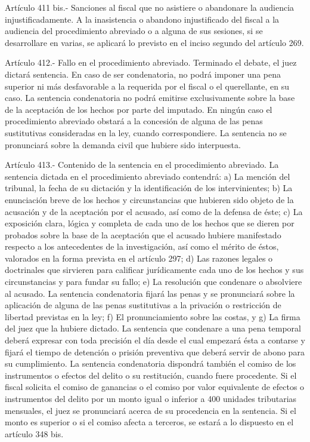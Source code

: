     Artículo 411 bis.- Sanciones al fiscal que no asistiere o abandonare la audiencia injustificadamente. A la inasistencia o abandono injustificado del fiscal a la audiencia del procedimiento abreviado o a alguna de sus sesiones, si se desarrollare en varias, se aplicará lo previsto en el inciso segundo del artículo 269.


    Artículo 412.- Fallo en el procedimiento abreviado. Terminado el debate, el juez dictará sentencia. En caso de ser condenatoria, no podrá imponer una pena superior ni más desfavorable a la requerida por el fiscal o el querellante, en su caso.
    La sentencia condenatoria no podrá emitirse exclusivamente sobre la base de la aceptación de los hechos por parte del imputado.
    En ningún caso el procedimiento abreviado obstará a la concesión de alguna de las penas sustitutivas consideradas en la ley, cuando correspondiere.
    La sentencia no se pronunciará sobre la demanda civil que hubiere sido interpuesta.


    Artículo 413.- Contenido de la sentencia en el procedimiento abreviado. La sentencia dictada en el procedimiento abreviado contendrá:
    a) La mención del tribunal, la fecha de su dictación y la identificación de los intervinientes;
    b) La enunciación breve de los hechos y circunstancias que hubieren sido objeto de la acusación y de la aceptación por el acusado, así como de la defensa de éste;
    c) La exposición clara, lógica y completa de cada uno de los hechos que se dieren por probados sobre la base de la aceptación que el acusado hubiere manifestado respecto a los antecedentes de la investigación, así como el mérito de éstos, valorados en la forma prevista en el artículo 297;
    d) Las razones legales o doctrinales que sirvieren para calificar jurídicamente cada uno de los hechos y sus circunstancias y para fundar su fallo;
    e) La resolución que condenare o absolviere al acusado. La sentencia condenatoria fijará las penas y se pronunciará sobre la aplicación de alguna de las penas sustitutivas a la privación o restricción de libertad previstas en la ley;
    f) El pronunciamiento sobre las costas, y g) La firma del juez que la hubiere dictado.
    La sentencia que condenare a una pena temporal deberá expresar con toda precisión el día desde el cual empezará ésta a contarse y fijará el tiempo de detención o prisión preventiva que deberá servir de abono para su cumplimiento.
    La sentencia condenatoria dispondrá también el comiso de los instrumentos o efectos del delito o su restitución, cuando fuere procedente.
    Si el fiscal solicita el comiso de ganancias o el comiso por valor equivalente de efectos o instrumentos del delito por un monto igual o inferior a 400 unidades tributarias mensuales, el juez se pronunciará acerca de su procedencia en la sentencia. Si el monto es superior o si el comiso afecta a terceros, se estará a lo dispuesto en el artículo 348 bis.



